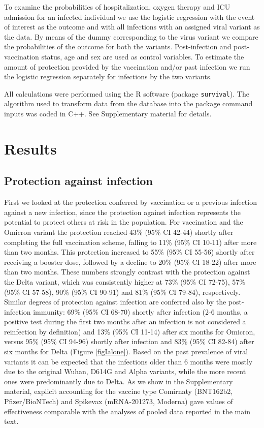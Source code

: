 \documentclass[9pt,twocolumn,twoside,lineno]{pnas-new}
\begin{document}
To examine the probabilities of hospitalization, oxygen therapy and ICU admission for an infected individual we use the logistic regression with the event of interest as the outcome and with all infections with an assigned viral variant as the data. By means of the dummy corresponding to the virus variant we compare the probabilities of the outcome for both the variants. Post-infection and post-vaccination status, age and sex are used as control variables. To estimate the amount of protection provided by the vaccination and/or past infection we run the logistic regression separately for infections by the two variants. %

 
All calculations were performed using the R software (package \verb|survival|). The algorithm used to transform data from the database into the package command inputs was coded in C++. See Supplementary material for details. 


\section*{Results}
\label{sec3}

\subsection*{Protection against infection}

First we looked at the protection conferred by vaccination or a previous infection against a new infection, since the protection against infection represents the potential to protect others at risk in the population. For vaccination and the Omicron variant the protection reached 43\% (95\% CI 42-44) shortly after completing the full vaccination scheme, falling to 11\% (95\% CI 10-11) after more than two months. This protection increased to 55\% (95\% CI 55-56) shortly after receiving a booster dose, followed by a decline to 20\% (95\% CI 18-22) after more than two months. These numbers strongly contrast with the protection against the Delta variant, which was consistently higher at 73\% (95\% CI 72-75), 57\% (95\% CI 57-58), 90\% (95\% CI 90-91) and 81\% (95\% CI 79-84), respectively. Similar degrees of protection against infection are conferred also by the post-infection immunity: 69\% (95\% CI 68-70) shortly after infection (2-6 months, a positive test during the first two months after an infection is not considered a reinfection by definition) and 13\% (95\% CI 11-14) after six months for Omicron, versus 95\% (95\% CI 94-96) shortly after infection and 83\% (95\% CI 82-84) after six months for Delta (Figure \ref{figIalone}). Based on the past prevalence of viral variants it can be expected that the infections older than 6 months were mostly due to the original Wuhan, D614G and Alpha variants, while the more recent ones were predominantly due to Delta. As we show in the Supplementary material, explicit accounting for the vaccine type Comirnaty (BNT162b2, Pfizer/BioNTech) and Spikevax (mRNA-201273, Moderna) gave values of effectiveness comparable with the analyses of pooled data reported in the main text.   
\end{document}
